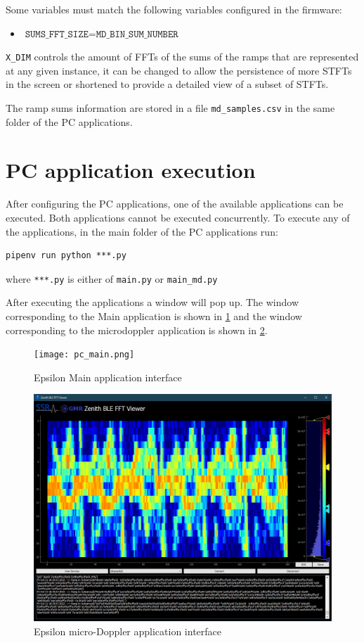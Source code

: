 Some variables must match the following variables configured in the firmware:
\begin{itemize}
	\item $\texttt{SUMS\_FFT\_SIZE} = \texttt{MD\_BIN\_SUM\_NUMBER}$
\end{itemize}

\texttt{X\_DIM} controls the amount of FFTs of the sums of the ramps that are represented at any given instance, it can be changed to allow the persistence of more STFTs in the screen or shortened to provide a detailed view of a subset of STFTs.

The ramp sums information are stored in a file \texttt{md\_samples.csv} in the same folder of the PC applications.

\section{PC application execution}

After configuring the PC applications, one of the available applications can be executed. Both applications cannot be executed concurrently. To execute any of the applications, in the main folder of the PC applications run:
\begin{verbatim}
pipenv run python ***.py
\end{verbatim}

where \texttt{***.py} is either of \texttt{main.py} or \texttt{main\_md.py}

After executing the applications a window will pop up. The window corresponding to the Main application is shown in \cref{fig:pc_main} and the window corresponding to the microdoppler application is shown in \cref{fig:pc_md}.

\begin{figure}[ht]
	\centering
	\texttt{[image: pc\_main.png]}
	\caption{Epsilon Main application interface \label{fig:pc_main}}
\end{figure}

\begin{figure}[ht]
	\centering
	\includegraphics[width=\linewidth]{img/gui_gait.png}
	\caption{Epsilon micro-Doppler application interface \label{fig:pc_md}}
\end{figure}

